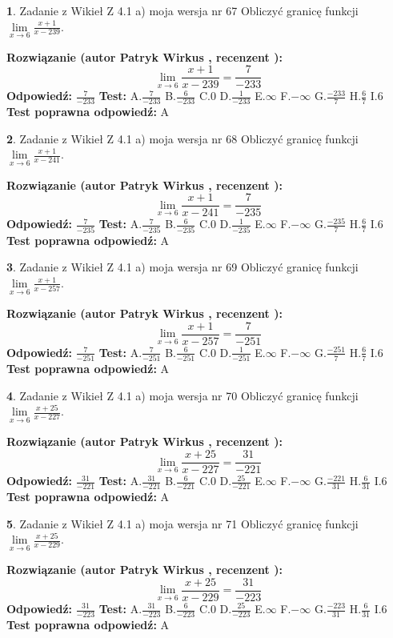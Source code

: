 \documentclass[12pt, a4paper]{article}
\theoremstyle{definition} %
\newtheorem{zad}{}
\newcommand{\zadStart}[1]{\begin{zad}#1\newline}
\newcommand{\zadStop}{\end{zad}}
\newcommand{\rozwStart}[2]{\noindent \textbf{Rozwiązanie (autor #1 , recenzent #2): }\newline}
\newcommand{\rozwStop}{\newline}
\newcommand{\odpStart}{\noindent \textbf{Odpowiedź:}\newline}
\newcommand{\odpStop}{\newline}
\newcommand{\testStart}{\noindent \textbf{Test:}\newline}
\newcommand{\testStop}{\newline}
\newcommand{\kluczStart}{\noindent \textbf{Test poprawna odpowiedź:}\newline}
\newcommand{\kluczStop}{\newline}
\begin{document}
\zadStart{Zadanie z Wikieł Z 4.1 a) moja wersja nr 67}
Obliczyć granicę funkcji $\lim\limits_{x\to6}\frac{x+1}{x-239}$.
\zadStop
\rozwStart{Patryk Wirkus}{}
$$\lim\limits_{x\to6}\frac{x+1}{x-239} = \frac{7}{-233}$$
\rozwStop
\odpStart
$\frac{7}{-233}$
\odpStop
\testStart
A.$\frac{7}{-233}$
B.$\frac{6}{-233}$
C.$0$
D.$\frac{1}{-233}$
E.$\infty$
F.$-\infty$
G.$\frac{-233}{7}$
H.$\frac{6}{7}$
I.$6$
\testStop
\kluczStart
A
\kluczStop



\zadStart{Zadanie z Wikieł Z 4.1 a) moja wersja nr 68}
Obliczyć granicę funkcji $\lim\limits_{x\to6}\frac{x+1}{x-241}$.
\zadStop
\rozwStart{Patryk Wirkus}{}
$$\lim\limits_{x\to6}\frac{x+1}{x-241} = \frac{7}{-235}$$
\rozwStop
\odpStart
$\frac{7}{-235}$
\odpStop
\testStart
A.$\frac{7}{-235}$
B.$\frac{6}{-235}$
C.$0$
D.$\frac{1}{-235}$
E.$\infty$
F.$-\infty$
G.$\frac{-235}{7}$
H.$\frac{6}{7}$
I.$6$
\testStop
\kluczStart
A
\kluczStop



\zadStart{Zadanie z Wikieł Z 4.1 a) moja wersja nr 69}
Obliczyć granicę funkcji $\lim\limits_{x\to6}\frac{x+1}{x-257}$.
\zadStop
\rozwStart{Patryk Wirkus}{}
$$\lim\limits_{x\to6}\frac{x+1}{x-257} = \frac{7}{-251}$$
\rozwStop
\odpStart
$\frac{7}{-251}$
\odpStop
\testStart
A.$\frac{7}{-251}$
B.$\frac{6}{-251}$
C.$0$
D.$\frac{1}{-251}$
E.$\infty$
F.$-\infty$
G.$\frac{-251}{7}$
H.$\frac{6}{7}$
I.$6$
\testStop
\kluczStart
A
\kluczStop



\zadStart{Zadanie z Wikieł Z 4.1 a) moja wersja nr 70}
Obliczyć granicę funkcji $\lim\limits_{x\to6}\frac{x+25}{x-227}$.
\zadStop
\rozwStart{Patryk Wirkus}{}
$$\lim\limits_{x\to6}\frac{x+25}{x-227} = \frac{31}{-221}$$
\rozwStop
\odpStart
$\frac{31}{-221}$
\odpStop
\testStart
A.$\frac{31}{-221}$
B.$\frac{6}{-221}$
C.$0$
D.$\frac{25}{-221}$
E.$\infty$
F.$-\infty$
G.$\frac{-221}{31}$
H.$\frac{6}{31}$
I.$6$
\testStop
\kluczStart
A
\kluczStop



\zadStart{Zadanie z Wikieł Z 4.1 a) moja wersja nr 71}
Obliczyć granicę funkcji $\lim\limits_{x\to6}\frac{x+25}{x-229}$.
\zadStop
\rozwStart{Patryk Wirkus}{}
$$\lim\limits_{x\to6}\frac{x+25}{x-229} = \frac{31}{-223}$$
\rozwStop
\odpStart
$\frac{31}{-223}$
\odpStop
\testStart
A.$\frac{31}{-223}$
B.$\frac{6}{-223}$
C.$0$
D.$\frac{25}{-223}$
E.$\infty$
F.$-\infty$
G.$\frac{-223}{31}$
H.$\frac{6}{31}$
I.$6$
\testStop
\kluczStart
A
\kluczStop
\end{document}
